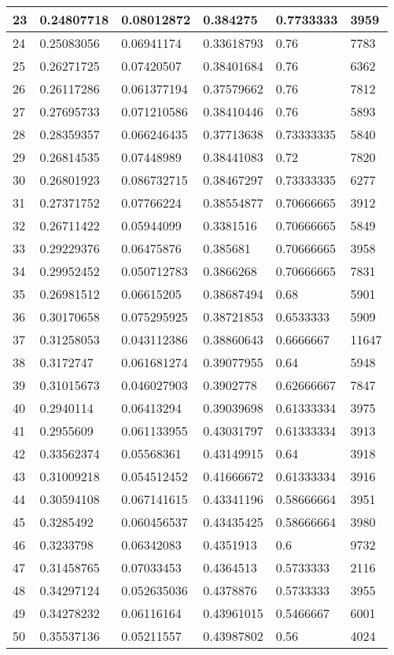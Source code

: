 \begin{longtable}{|l|l|l|l|l|l|}
23 & 0.24807718 & 0.08012872 & 0.384275 & 0.7733333 & 3959 \\ \hline 
24 & 0.25083056 & 0.06941174 & 0.33618793 & 0.76 & 7783 \\ \hline 
25 & 0.26271725 & 0.07420507 & 0.38401684 & 0.76 & 6362 \\ \hline 
26 & 0.26117286 & 0.061377194 & 0.37579662 & 0.76 & 7812 \\ \hline 
27 & 0.27695733 & 0.071210586 & 0.38410446 & 0.76 & 5893 \\ \hline 
28 & 0.28359357 & 0.066246435 & 0.37713638 & 0.73333335 & 5840 \\ \hline 
29 & 0.26814535 & 0.07448989 & 0.38441083 & 0.72 & 7820 \\ \hline 
30 & 0.26801923 & 0.086732715 & 0.38467297 & 0.73333335 & 6277 \\ \hline 
31 & 0.27371752 & 0.07766224 & 0.38554877 & 0.70666665 & 3912 \\ \hline 
32 & 0.26711422 & 0.05944099 & 0.3381516 & 0.70666665 & 5849 \\ \hline 
33 & 0.29229376 & 0.06475876 & 0.385681 & 0.70666665 & 3958 \\ \hline 
34 & 0.29952452 & 0.050712783 & 0.3866268 & 0.70666665 & 7831 \\ \hline 
35 & 0.26981512 & 0.06615205 & 0.38687494 & 0.68 & 5901 \\ \hline 
36 & 0.30170658 & 0.075295925 & 0.38721853 & 0.6533333 & 5909 \\ \hline 
37 & 0.31258053 & 0.043112386 & 0.38860643 & 0.6666667 & 11647 \\ \hline 
38 & 0.3172747 & 0.061681274 & 0.39077955 & 0.64 & 5948 \\ \hline 
39 & 0.31015673 & 0.046027903 & 0.3902778 & 0.62666667 & 7847 \\ \hline 
40 & 0.2940114 & 0.06413294 & 0.39039698 & 0.61333334 & 3975 \\ \hline 
41 & 0.2955609 & 0.061133955 & 0.43031797 & 0.61333334 & 3913 \\ \hline 
42 & 0.33562374 & 0.05568361 & 0.43149915 & 0.64 & 3918 \\ \hline 
43 & 0.31009218 & 0.054512452 & 0.41666672 & 0.61333334 & 3916 \\ \hline 
44 & 0.30594108 & 0.067141615 & 0.43341196 & 0.58666664 & 3951 \\ \hline 
45 & 0.3285492 & 0.060456537 & 0.43435425 & 0.58666664 & 3980 \\ \hline 
46 & 0.3233798 & 0.06342083 & 0.4351913 & 0.6 & 9732 \\ \hline 
47 & 0.31458765 & 0.07033453 & 0.4364513 & 0.5733333 & 2116 \\ \hline 
48 & 0.34297124 & 0.052635036 & 0.4378876 & 0.5733333 & 3955 \\ \hline 
49 & 0.34278232 & 0.06116164 & 0.43961015 & 0.5466667 & 6001 \\ \hline 
50 & 0.35537136 & 0.05211557 & 0.43987802 & 0.56 & 4024 \\ \hline 
\end{longtable}